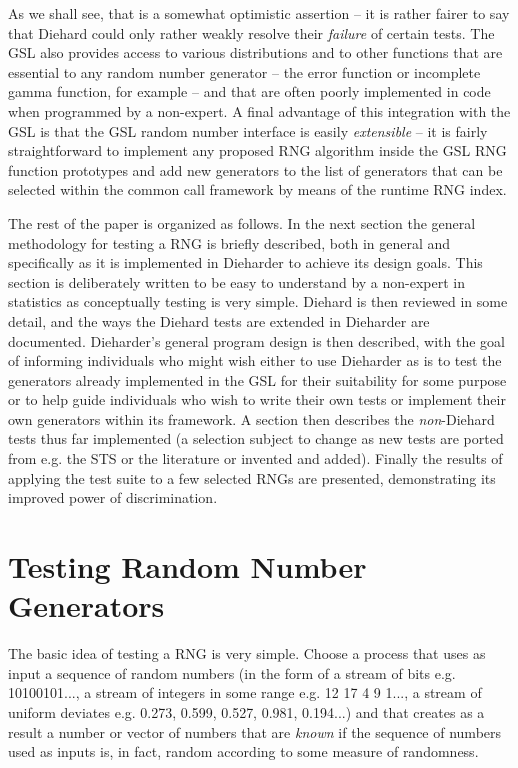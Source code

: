 \documentclass[12pt]{book}
\begin{document}
As we shall see, that is a somewhat optimistic assertion -- it is rather
fairer to say that Diehard could only rather weakly resolve their {\em
failure} of certain tests.  The GSL also provides access to various
distributions and to other functions that are essential to any random
number generator -- the error function or incomplete gamma function, for
example -- and that are often poorly implemented in code when programmed
by a non-expert.  A final advantage of this integration with the GSL is
that the GSL random number interface is easily {\em extensible} -- it is
fairly straightforward to implement any proposed RNG algorithm inside
the GSL RNG function prototypes and add new generators to the list of
generators that can be selected within the common call framework by
means of the runtime RNG index.

The rest of the paper is organized as follows.  In the next section the
general methodology for testing a RNG is briefly described, both in
general and specifically as it is implemented in Dieharder to achieve
its design goals.  This section is deliberately written to be easy to
understand by a non-expert in statistics as conceptually testing is very
simple.  Diehard is then reviewed in some detail, and the ways the
Diehard tests are extended in Dieharder are documented.  Dieharder's
general program design is then described, with the goal of informing
individuals who might wish either to use Dieharder as is to test the
generators already implemented in the GSL for their suitability for some
purpose or to help guide individuals who wish to write their own tests
or implement their own generators within its framework.  A section then
describes the {\em non}-Diehard tests thus far implemented (a selection
subject to change as new tests are ported from e.g. the STS or the
literature or invented and added).  Finally the results of applying the
test suite to a few selected RNGs are presented, demonstrating its
improved power of discrimination.

\chapter{Testing Random Number Generators}

The basic idea of testing a RNG is very simple.  Choose a process that
uses as input a sequence of random numbers (in the form of a stream of
bits e.g. 10100101..., a stream of integers in some range e.g. 12 17 4 9
1..., a stream of uniform deviates e.g. 0.273, 0.599, 0.527, 0.981,
0.194...) and that creates as a result a number or vector of numbers
that are {\em known} if the sequence of numbers used as inputs is, in
fact, random according to some measure of randomness.
\end{document}
